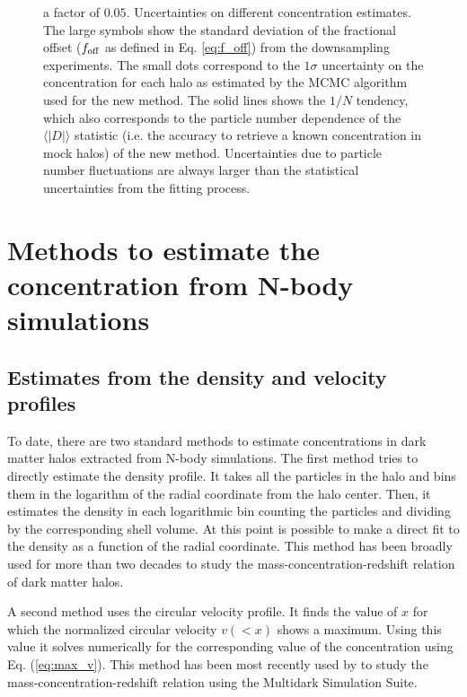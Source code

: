 \documentclass{emulateapj}
\begin{document}
\begin{figure}
{  a factor of $0.05$.
Uncertainties on different concentration estimates.  The
  large symbols show the standard deviation of the fractional offset
  ($f_{\rm off}$ as defined in Eq. \ref{eq:f_off}) from the downsampling
  experiments.  The small dots correspond to the $1\sigma$
  uncertainty on the concentration for each halo as estimated by the
  MCMC algorithm used for the new method.
  The solid lines shows the $1/N$ tendency, which also corresponds
  to the particle number dependence of the $\langle|D|\rangle$ statistic
  (i.e. the accuracy to retrieve a known concentration in mock halos)
  of the new method.
  Uncertainties due to particle number fluctuations are always larger
  than the statistical uncertainties from the fitting process. 
    \label{fig:downsampling}}
\end{figure}



\section{Methods to estimate the concentration from N-body simulations}
\label{sec:method}

\subsection{Estimates from the density and velocity profiles}

To date, there are two standard methods to estimate concentrations in
dark matter halos extracted from N-body simulations.  The first method
tries to directly estimate the density profile.  It takes all the
particles in the halo and bins them in the logarithm of the radial
coordinate from the halo center.  Then, it estimates the density in
each logarithmic bin counting the particles and dividing by the
corresponding shell volume.  At this point is possible to make a
direct fit to the density as a function of the radial coordinate.
This method has been broadly used for more than two decades to study
the mass-concentration-redshift relation of dark matter halos.
 
A second method uses the circular velocity profile.  It finds the
value of $x$ for which the normalized circular velocity $v(<x)$ shows
a maximum.  Using this value it solves numerically for the
corresponding value of the concentration using Eq. (\ref{eq:max_v}).
This method has been most recently used by \cite{Klypin2016} to study
the mass-concentration-redshift relation using the Multidark
Simulation Suite.
\end{document}
